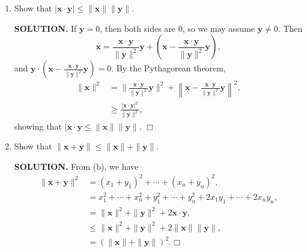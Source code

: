 \documentclass{article}
\begin{document}
\begin{enumerate}
\begin{enumerate}
        {\bf SOLUTION.} 
        \begin{align*}
            \mathbf{x} \cdot (\mathbf{y}+ \mathbf{z}) &= \mathbf{x} \cdot (y_1 + z_1, \cdots, y_n + z_n), \\
            &= x_1(y_1+z_1) + \cdots + x_n(y_n+z_n), \\
            &= x_1y_1 + \cdots x_ny_n + x_1z_1 + \cdots + x_nz_n, \\
            &= (\mathbf{x} \cdot \mathbf{y} )+ (\mathbf{x} \cdot \mathbf{z}). \Box
        \end{align*}
        
        \item Show that $|\mathbf{x} \cdot \mathbf{y}| \leq \|\mathbf{x}\|\|\mathbf{y}\|$.

        {\bf SOLUTION.} If $\mathbf{y} = 0$, then both sides are $0$, so we may assume $\mathbf{y} \neq 0$. Then
        $$\mathbf{x} = \frac{\mathbf{x} \cdot \mathbf{y}}{\|\mathbf{y}\|^2}\mathbf{y} + \left( \mathbf{x} - \frac{\mathbf{x} \cdot \mathbf{y}}{\|\mathbf{y}\|^2}\mathbf{y}\right),$$
        and $\mathbf{y} \cdot\left(\mathbf{x} - \frac{\mathbf{x} \cdot \mathbf{y}}{\|\mathbf{y}\|^2}\mathbf{y}\right)=0$. By the Pythagorean theorem,
        \begin{align*}
            \|\mathbf{x}\|^2 &= \|\frac{\mathbf{x} \cdot \mathbf{y}}{\|\mathbf{y}\|^2} \mathbf{y}\|^2 + \left\| \mathbf{x} - \frac{\mathbf{x} \cdot \mathbf{y}}{\|\mathbf{y}\|^2}\mathbf{y}\right\|^2, \\
            &\geq \frac{|\mathbf{x} \cdot \mathbf{y}|^2}{\|\mathbf{y}\|^2},
        \end{align*}
        showing that $|\mathbf{x} \cdot \mathbf{y} \leq \|\mathbf{x}\|\|\mathbf{y}\|$. $\Box$
        
        \item Show that $\|\mathbf{x} + \mathbf{y}\| \leq \| \mathbf{x} \| + \| \mathbf{y} \|$.

        {\bf SOLUTION.} From (b), we have
        \begin{align*}
            \|\mathbf{x} + \mathbf{y}\|^2 &= (x_1 + y_1)^2 + \cdots + (x_n+y_n)^2, \\
            &= x_1^2 + \cdots + x_n^2 + y_1^2 + \cdots + y_n^2 + 2x_1y_1 + \cdots + 2x_ny_n, \\
            &= \|\mathbf{x}\|^2 + \|\mathbf{y}\|^2 + 2\mathbf{x} \cdot \mathbf{y}, \\
            &\leq \|\mathbf{x}\|^2 + \|\mathbf{y}\|^2 + 2\|\mathbf{x} \|\| \mathbf{y}\|, \\
            &= (\|\mathbf{x}\| + \|\mathbf{y}\|)^2. \Box
        \end{align*}
                    

\end{enumerate}
\end{enumerate}
\end{document}
